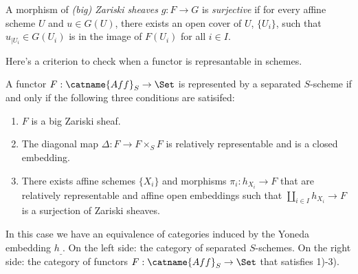 \documentclass[11pt, english]{article}
\begin{document}
\begin{defi}
A morphism of \emph{(big) Zariski sheaves} $g:F \to G$ is \emph{surjective} if for every affine scheme $U$ and $u \in G(U)$, there exists an open cover of $U$, $\{U_i\}$, such that $u_{|U_i} \in G(U_i)$ is in the image of $F(U_i)$ for all $i \in I$.
\end{defi}

Here's a criterion to check when a functor is represantable in schemes.

\begin{prop}
A functor $F:\catname{Aff}_S \to \Set$ is represented by a separated $S$-scheme if and only if the following three conditions are satisifed:
\begin{enumerate}
\item $F$ is a big Zariski sheaf.
\item The diagonal map  $\Delta: F \to F \times_S F$ is relatively representable and is a closed embedding.
\item There exists affine schemes $\{X_i \}$ and morphisms $\pi_i:h_{X_i} \to F$ that are relatively representable and affine open embeddings such that $\coprod_{i \in I} h_{X_i} \to F$ is a surjection of Zariski sheaves.
\end{enumerate}
In this case we have an equivalence of categories induced by the Yoneda embedding $h_{\_}$. On the left side: the category of separated $S$-schemes. On the right side: the category of functors $F:\catname{Aff}_S \to \Set$ that satisfies 1)-3).
\end{prop}
\end{document}
